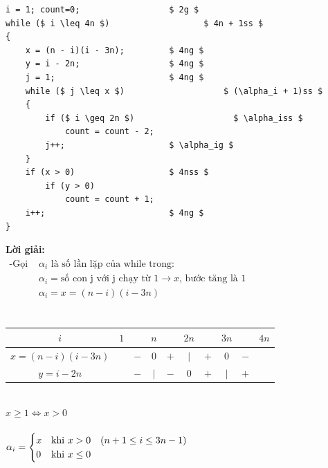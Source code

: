 \documentclass[12pt, letterpaper]{article}
\begin{document}
\begin{lstlisting}
i = 1; count=0;                  $ 2g $
while ($ i \leq 4n $)           		$ 4n + 1ss $
{
    x = (n - i)(i - 3n);         $ 4ng $
    y = i - 2n;                  $ 4ng $
    j = 1;                       $ 4ng $
    while ($ j \leq x $)                    $ (\alpha_i + 1)ss $
    {
        if ($ i \geq 2n $)                    $ \alpha_iss $
            count = count - 2;
        j++;                     $ \alpha_ig $
    }
    if (x > 0)                   $ 4nss $
        if (y > 0)
            count = count + 1;
    i++;                         $ 4ng $
}
\end{lstlisting}
\textbf{Lời giải:} \\
$ \begin{aligned}
		\text{-Gọi } & \alpha_i \text{ là số lần lặp của while trong:}                                  \\
		             & \alpha_i = \text{số con j với j chạy từ 1} \rightarrow x \text{, bước tăng là 1} \\
		             & \alpha_i = x = (n-i)(i-3n)                                                       \\
	\end{aligned} $ \\
 \\
\begin{table}[htb]
	\begin{tabular}{c|c c c c c c c c c}
		$i$               & $1$ &     & $n$     &     & $2n$    &     & $3n$    &     & $4n$ \\
		\hline
		$x = (n-i)(i-3n)$ &     & $-$ & $0$     & $+$ & $\vert$ & $+$ & $0$     & $-$        \\
		\hline
		$y = i - 2n$      &     & $-$ & $\vert$ & $-$ & $0$     & $+$ & $\vert$ & $+$        \\
	\end{tabular}
\end{table} \\
 $x \geq 1 \Leftrightarrow x > 0$ \\ \\
$\alpha_i =
\begin{cases}
	x & \text{khi } x>0 \quad (n + 1 \leq i \leq 3n - 1) \\
	0 & \text{khi } x\leq 0
\end{cases} \\$
 \\
\end{document}
